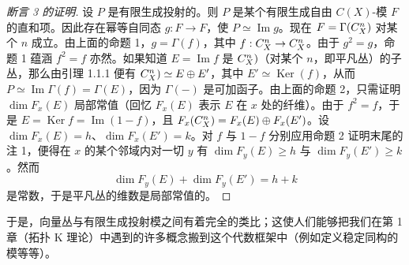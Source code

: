 \begin{proof}[断言 3 的证明] 设 $P$ 是有限生成投射的。则 $P$ 是某个有限生成自由 $C(X)$-模 $F$ 的直和项。因此存在幂等自同态 $g : F \to F$，使 $P \simeq \operatorname{Im}g$。现在 $F = \Gamma(C^n_X)$ 对某个 $n$ 成立。由上面的命题 1，$g = \Gamma(f)$，其中 $f : C^n_X \to C^n_X$。由于 $g^2 = g$，命题 1 蕴涵 $f^2 = f$ 亦然。如果知道 $E = \operatorname{Im}f$ 是 $C^n_X)$（对某个 $n$，即平凡丛）的子丛，那么由引理 1.1.1 便有 $C^n_X) \simeq E \oplus E'$，其中 $E' \simeq \operatorname{Ker}(f)$，从而 $P \simeq \operatorname{Im}\Gamma(f) = \Gamma(E)$，因为 $\Gamma(-)$ 是可加函子。由上面的命题 2，只需证明 $\operatorname{dim}F_x(E)$ 局部常值（回忆 $F_x(E)$ 表示 $E$ 在 $x$ 处的纤维）。由于 $f^2 = f$，于是 $E = \operatorname{Ker}f = \operatorname{Im}(1-f)$，且 $F_x(C^n_X) = F_x(E) \oplus F_x(E')$。设 $\operatorname{dim}F_x(E) = h$、$\operatorname{dim}F_x(E') = k$。对 $f$ 与 $1-f$ 分别应用命题 2 证明末尾的注 1，便得在 $x$ 的某个邻域内对一切 $y$ 有 $\operatorname{dim}F_y(E) \ge h$ 与 $\operatorname{dim}F_y(E') \ge k$。然而
\[ \operatorname{dim}F_y(E) + \operatorname{dim}F_y(E') = h + k \]
是常数，于是平凡丛的维数是局部常值的。\end{proof}

于是，向量丛与有限生成投射模之间有着完全的类比；这使人们能够把我们在第 1 章（拓扑 K 理论）中遇到的许多概念搬到这个代数框架中（例如定义稳定同构的模等等）。
